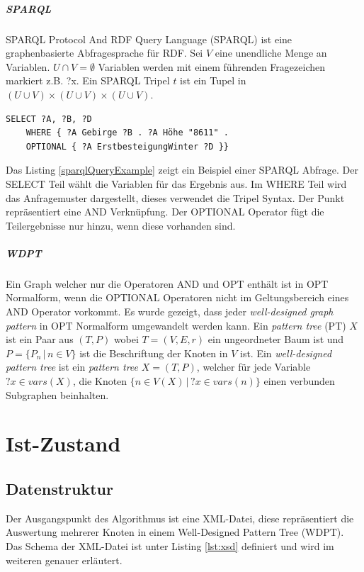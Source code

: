 \documentclass[draft,final]{vutinfth} %
\begin{document}
\paragraph{SPARQL}
SPARQL Protocol And RDF Query Language (SPARQL) ist eine graphenbasierte Abfragesprache für RDF.  Sei $V$ eine unendliche Menge an Variablen. $U \cap V = \emptyset$ Variablen werden mit einem führenden Fragezeichen markiert z.B. ?x. Ein SPARQL Tripel $t$ ist ein Tupel in $(U \cup V) \times (U \cup V) \times (U \cup V)$.  

\begin{lstlisting}[language=Sparql,caption={SPARQL Beispiel},frame = single,label={sparqlQueryExample}]
SELECT ?A, ?B, ?D
	WHERE { ?A Gebirge ?B . ?A Höhe "8611" . 
	OPTIONAL { ?A ErstbesteigungWinter ?D }}
\end{lstlisting}

Das Listing \ref{sparqlQueryExample} zeigt ein Beispiel einer SPARQL Abfrage. Der SELECT Teil wählt die Variablen für das Ergebnis aus. Im WHERE Teil wird das Anfragemuster dargestellt, dieses verwendet die Tripel Syntax. Der Punkt repräsentiert eine AND Verknüpfung. Der OPTIONAL Operator fügt die Teilergebnisse nur hinzu, wenn diese vorhanden sind.

\cite{SPARQL}


\paragraph{WDPT}
Ein Graph welcher nur die Operatoren AND und OPT enthält ist in OPT Normalform, wenn die OPTIONAL Operatoren nicht im Geltungsbereich eines AND Operator vorkommt. Es wurde gezeigt, dass jeder \textit{well-designed graph pattern} in OPT Normalform umgewandelt werden kann. Ein \textit{pattern tree} (PT) $X$ ist ein Paar aus $(T,P)$ wobei $T = (V,E,r)$ ein ungeordneter Baum ist und $P = \{P_n \, | \, n \in V\}$ ist die Beschriftung der Knoten in $V$ ist. Ein \textit{well-designed pattern tree} ist ein \textit{pattern tree }$X = (T,P)$, welcher für jede Variable $?x \in vars(X)$, die Knoten $\{n \in V(X)\, | \, ?x \in vars(n)\}$ einen verbunden Subgraphen beinhalten. 

\cite{DBLP:conf/www/AhmetajFPSS15}

\chapter{Ist-Zustand} \label{istZustand}
\section{Datenstruktur} \label{dataStruk}
Der Ausgangspunkt des Algorithmus ist eine XML-Datei, diese repräsentiert die Auswertung  mehrerer Knoten in einem Well-Designed Pattern Tree (WDPT). Das Schema der XML-Datei ist unter Listing \ref{lst:xsd} definiert und wird im weiteren genauer erläutert.
\end{document}
